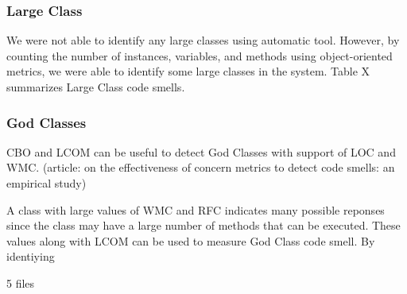 \subsubsection{Large Class}
We were not able to identify any large classes using automatic tool. However, by counting the number of instances, variables, and methods using object-oriented metrics, we were able to identify some large classes in the system. Table X summarizes Large Class code smells. 

\subsubsection{God Classes}
CBO and LCOM can be useful to detect God Classes with support of LOC and WMC. (article: on the effectiveness of concern metrics to detect code smells: an empirical study)

A class with large values of WMC and RFC indicates many possible reponses since the class may have a large number of methods that can be executed. These values along with LCOM can be used to measure God Class code smell. By identiying 

5 files











































